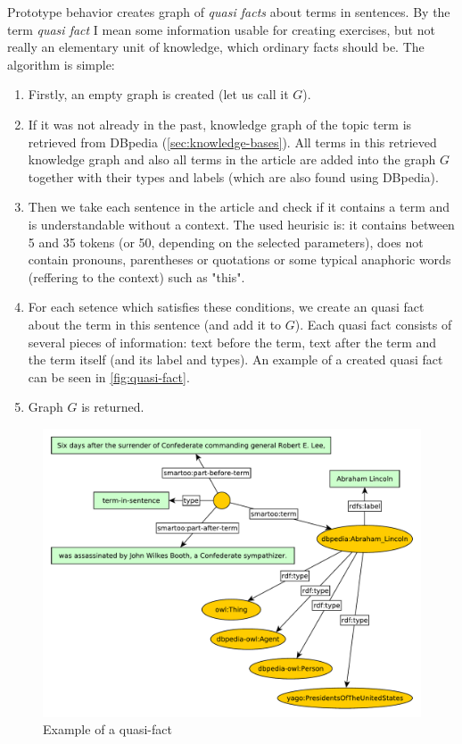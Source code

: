 \documentclass[a4paper, 12pt, twoside]{fithesis2}		%
\renewcommand{\_}{\leavevmode \kern0.07em\vbox{\hrule width0.4em}}
\newenvironment{myEnumerate}{
  \begin{enumerate}[leftmargin=2em,rightmargin=1em,itemsep=\parskip ,parsep=0em,topsep=0em,partopsep=0em]
}{
  \end{enumerate}
}
\begin{document}

Prototype behavior creates graph of \textit{quasi facts} about terms in sentences.
By the term \textit{quasi fact} I mean some information usable for creating exercises, but not really an elementary unit of knowledge, which ordinary facts should be. The algorithm is simple:
\begin{myEnumerate}
  \item Firstly, an empty graph is created (let us call it $G$).
  \item If it was not already in the past, knowledge graph of the topic term is retrieved from DBpedia (\autoref{sec:knowledge-bases}). All terms in this retrieved knowledge graph and also all terms in the article are added into the graph $G$ together with their types and labels (which are also found using DBpedia).
  \item Then we take each sentence in the article and check if it contains a term and is understandable without a context. The used heurisic is: it contains between 5 and 35 tokens (or 50, depending on the selected parameters), does not contain pronouns, parentheses or quotations or some typical anaphoric words (reffering to the context) such as "this".
  \item For each setence which satisfies these conditions, we create an quasi fact about the term in this sentence (and add it to $G$). Each quasi fact consists of several pieces of information: text before the term, text after the term and the term itself (and its label and types). An example of a created quasi fact can be seen in \autoref{fig:quasi-fact}.
  \item Graph $G$ is returned.
\end{myEnumerate}


\begin{figure}[h]
  \centering
  \includegraphics[width=\textwidth]{images/quasi-fact-lincoln.pdf}
  \caption{Example of a quasi-fact}
  \label{fig:quasi-fact}
\end{figure}
\end{document}
